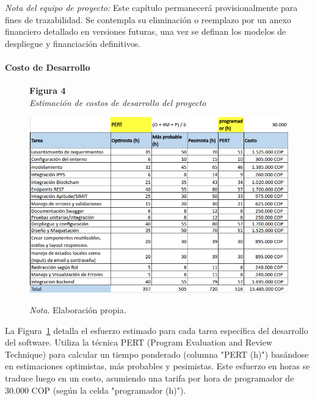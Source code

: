 \medskip
\textit{Nota del equipo de proyecto:} Este capítulo permanecerá provisionalmente para fines de trazabilidad. Se contempla su eliminación o reemplazo por un anexo financiero detallado en versiones futuras, una vez se definan los modelos de despliegue y financiación definitivos.

\paragraph{Costo de Desarrollo }
\begin{figure}[htbp]
    \begin{flushleft}
        \textbf{Figura 4}\\[2em]
        \textit{Estimación de costos de desarrollo del proyecto}
    \end{flushleft}
    \vspace{1em}
    \centering
    \includegraphics[width=\textwidth]{Images/costos3.png}
    \vspace{2em}
    \begin{flushleft}
        \textit{Nota.} Elaboración propia.
    \end{flushleft}
    \label{fig:costos3}
\end{figure}

La Figura~\ref{fig:costos3} detalla el esfuerzo estimado para cada tarea específica del desarrollo del software. Utiliza la técnica PERT (Program Evaluation and Review Technique) para calcular un tiempo ponderado (columna "PERT (h)") basándose en estimaciones optimistas, más probables y pesimistas. Este esfuerzo en horas se traduce luego en un costo, asumiendo una tarifa por hora de programador de 30.000 COP (según la celda "programador (h)"). 
